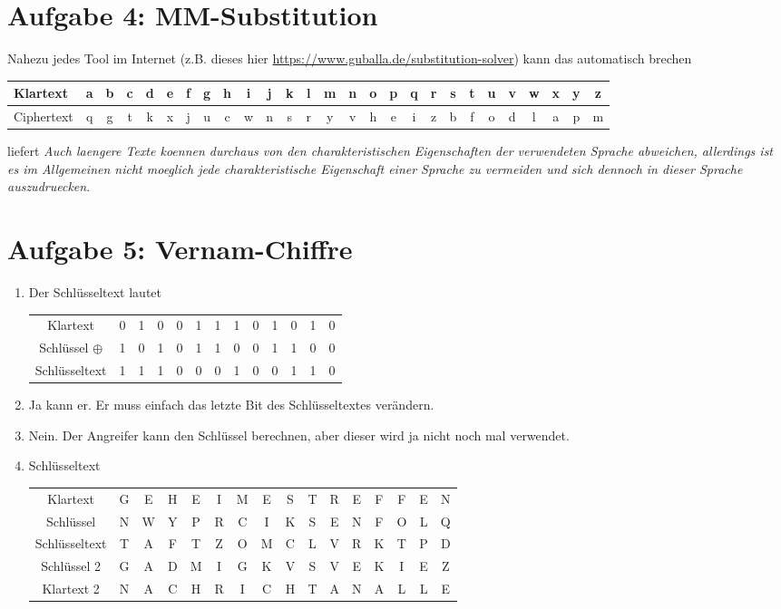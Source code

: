 \documentclass{article}
\begin{document}
	\section*{Aufgabe 4: MM-Substitution}
	Nahezu jedes Tool im Internet (z.B. dieses hier \url{https://www.guballa.de/substitution-solver}) kann das automatisch brechen
	\begin{center}
		\begin{tabular}{l|cccccccccccccccccccccccccc}
			Klartext & a&b&c&d&e&f&g&h&i&j&k&l&m&n&o&p&q&r&s&t&u&v&w&x&y&z\\
			\hline
			Ciphertext & q&g&t&k&x&j&u&c&w&n&s&r&y&v&h&e&i&z&b&f&o&d&l&a&p&m
		\end{tabular}
	\end{center}
	liefert \textit{Auch laengere Texte koennen durchaus von den charakteristischen Eigenschaften der verwendeten Sprache abweichen, allerdings ist es im Allgemeinen nicht moeglich jede charakteristische Eigenschaft einer Sprache zu vermeiden und sich dennoch in dieser Sprache auszudruecken}.
	
	\section*{Aufgabe 5: Vernam-Chiffre}
	\begin{enumerate}[label=(\alph*)]
		\item Der Schlüsseltext lautet
		\begin{center}
			\begin{tabular}{c|cccccccccccc}
				 Klartext & 0 & 1 & 0 & 0 & 1 & 1 & 1 & 0 & 1 & 0 & 1 & 0 \\
				 Schlüssel $\oplus$ & 1 & 0 & 1 & 0 & 1 & 1 & 0 & 0 & 1 & 1 & 0 & 0 \\
				 \hline
				 Schlüsseltext & 1 & 1 & 1 & 0 & 0 & 0 & 1 & 0 & 0 & 1 & 1 & 0
			\end{tabular}
		\end{center}
		\item Ja kann er. Er muss einfach das letzte Bit des Schlüsseltextes verändern.
		\item Nein. Der Angreifer kann den Schlüssel berechnen, aber dieser wird ja nicht noch mal verwendet.
		\item Schlüsseltext
		\begin{center}
			\begin{tabular}{c|ccccccccccccccc}
				Klartext & G & E & H & E & I & M & E & S & T & R & E & F & F & E & N \\
				Schlüssel & N & W & Y & P & R & C & I & K & S & E & N & F & O & L & Q \\
				\hline
				Schlüsseltext & T & A & F & T & Z & O & M & C & L & V & R & K & T & P & D \\
				Schlüssel 2 & G & A & D & M & I & G & K & V & S & V & E & K & I & E & Z \\
				\hline
				Klartext 2 & N & A & C & H & R & I & C & H & T & A & N & A & L & L & E
			\end{tabular}
		\end{center}
	\end{enumerate}
\end{document}

